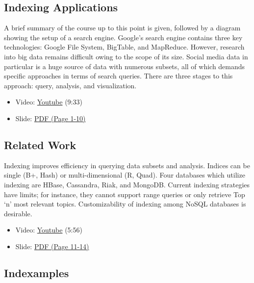 \subsection{Indexing Applications}\label{indexing-applications}

A brief summary of the course up to this point is given, followed by a
diagram showing the setup of a search engine. Google's search engine
contains three key technologies: Google File System, BigTable, and
MapReduce. However, research into big data remains difficult owing to
the scope of its size. Social media data in particular is a huge source
of data with numerous subsets, all of which demands specific approaches
in terms of search queries. There are three stages to this approach:
query, analysis, and visualization.

\begin{itemize}
\tightlist
\item
  Video: \href{https://www.youtube.com/watch?v=MxgabfoGH-M}{Youtube}
  (9:33)
\item
  Slide:
  \href{https://drive.google.com/open?id=0B88HKpainTSfWUh6dVNHcXloSnc}{PDF
  (Page 1-10)}
\end{itemize}

\subsection{Related Work}\label{related-work}

Indexing improves efficiency in querying data subsets and analysis.
Indices can be single (B+, Hash) or multi-dimensional (R, Quad). Four
databases which utilize indexing are HBase, Cassandra, Riak, and
MongoDB. Current indexing strategies have limits; for instance, they
cannot support range queries or only retrieve Top `n' most relevant
topics. Customizability of indexing among NoSQL databases is desirable.

\begin{itemize}
\tightlist
\item
  Video: \href{https://www.youtube.com/watch?v=NDjAdFSVzxo}{Youtube}
  (5:56)
\item
  Slide:
  \href{https://drive.google.com/open?id=0B88HKpainTSfWUh6dVNHcXloSnc}{PDF
  (Page 11-14)}
\end{itemize}

\subsection{Indexamples}\label{indexamples}

